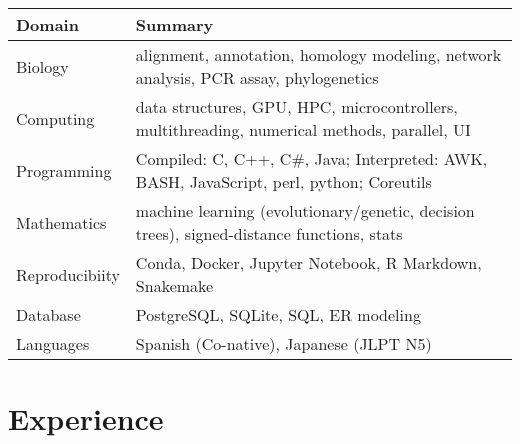 \documentclass[11pt,a4paper,]{awesome-cv}
\begin{document}
\begin{tabular}{l|l}
\hline
\textbf{Domain} & \textbf{Summary}\\
\hline
Biology & alignment, annotation, homology modeling, network analysis, PCR assay, phylogenetics\\
\hline
Computing & data structures, GPU, HPC, microcontrollers, multithreading, numerical methods, parallel, UI\\
\hline
Programming & Compiled: C, C++, C\#, Java; Interpreted: AWK, BASH, JavaScript, perl, python; Coreutils\\
\hline
Mathematics & machine learning (evolutionary/genetic, decision trees), signed-distance functions, stats\\
\hline
Reproducibiity & Conda, Docker, Jupyter Notebook, R Markdown, Snakemake\\
\hline
Database & PostgreSQL, SQLite, SQL, ER modeling\\
\hline
Languages & Spanish (Co-native), Japanese (JLPT N5)\\
\hline
\end{tabular}

\hypertarget{experience}{%
\section{Experience}\label{experience}}
\end{document}
